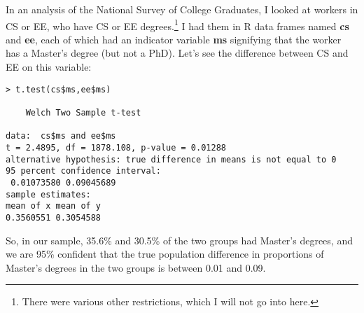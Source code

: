 In an analysis of the National Survey of College Graduates, I looked at
workers in CS or EE, who have CS or EE degrees.\footnote{There were
various other restrictions, which I will not go into here.}  I had them
in R data frames named {\bf cs} and {\bf ee}, each of which had an
indicator variable {\bf ms} signifying that the worker has a Master's
degree (but not a PhD).  Let's see the difference between CS and EE on
this variable:

\begin{lstlisting}
> t.test(cs$ms,ee$ms)

	Welch Two Sample t-test

data:  cs$ms and ee$ms 
t = 2.4895, df = 1878.108, p-value = 0.01288
alternative hypothesis: true difference in means is not equal to 0 
95 percent confidence interval:
 0.01073580 0.09045689 
sample estimates:
mean of x mean of y 
0.3560551 0.3054588 
\end{lstlisting}

So, in our sample, 35.6\% and 30.5\% of the two groups had Master's
degrees, and we are 95\% confident that the true population difference
in proportions of Master's degrees in the two groups is between 0.01 and
0.09.

